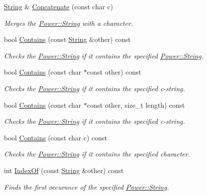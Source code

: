 \begin{DoxyCompactItemize}
\hyperlink{class_power_1_1_string}{String} \& \hyperlink{class_power_1_1_string_a27c784f6b30c2ca3504cb217a3f3107a}{Concatenate} (const char c)
\begin{DoxyCompactList}\small\item\em Merges the \hyperlink{class_power_1_1_string}{Power\+::\+String} with a character. \end{DoxyCompactList}\item 
bool \hyperlink{class_power_1_1_string_aeaa32e499b49e67539953355b53609a8}{Contains} (const \hyperlink{class_power_1_1_string}{String} \&other) const
\begin{DoxyCompactList}\small\item\em Checks the \hyperlink{class_power_1_1_string}{Power\+::\+String} if it contains the specified \hyperlink{class_power_1_1_string}{Power\+::\+String}. \end{DoxyCompactList}\item 
bool \hyperlink{class_power_1_1_string_ad90a05c6e07bcd98684bd7c2aec7723f}{Contains} (const char $\ast$const other) const
\begin{DoxyCompactList}\small\item\em Checks the \hyperlink{class_power_1_1_string}{Power\+::\+String} if it contains the specified c-\/string. \end{DoxyCompactList}\item 
bool \hyperlink{class_power_1_1_string_a7ed6567e4c08c0b61f415039a665d3ff}{Contains} (const char $\ast$const other, size\+\_\+t length) const
\begin{DoxyCompactList}\small\item\em Checks the \hyperlink{class_power_1_1_string}{Power\+::\+String} if it contains the specified c-\/string. \end{DoxyCompactList}\item 
bool \hyperlink{class_power_1_1_string_a728af5dfae32933d8548a657d7cd2043}{Contains} (const char c) const
\begin{DoxyCompactList}\small\item\em Checks the \hyperlink{class_power_1_1_string}{Power\+::\+String} if it contains the specified character. \end{DoxyCompactList}\item 
int \hyperlink{class_power_1_1_string_a91a17a73900ea3e77e01f6d816a5bb39}{Index\+Of} (const \hyperlink{class_power_1_1_string}{String} \&other) const
\begin{DoxyCompactList}\small\item\em Finds the first occurance of the specified \hyperlink{class_power_1_1_string}{Power\+::\+String}. \end{DoxyCompactList}\item 

\end{DoxyCompactItemize}
